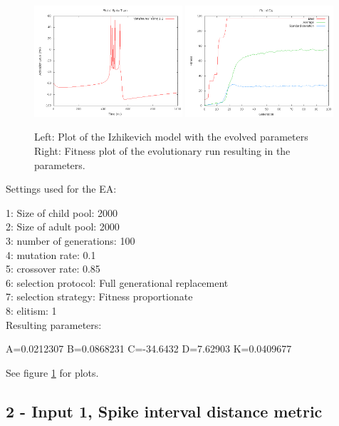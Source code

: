 \documentclass[11pt]{article}
\begin{document}
\begin{figure}
\begin{center}
\mbox{\includegraphics[width=0.49\textwidth]{images/1-res.png}}
\mbox{\includegraphics[width=0.49\textwidth]{images/1-fit.png}}
\end{center}
\caption{Left: Plot of the Izhikevich model with the evolved parameters\\
Right: Fitness plot of the evolutionary run resulting in the parameters.}
\label{fig:1}
\end{figure}

Settings used for the EA:

1: Size of child pool: 2000\\
2: Size of adult pool: 2000\\
3: number of generations: 100\\
4: mutation rate: 0.1\\
5: crossover rate: 0.85\\
6: selection protocol: Full generational replacement\\
7: selection strategy: Fitness proportionate\\
8: elitism: 1\\

Resulting parameters:

A=0.0212307 B=0.0868231 C=-34.6432 D=7.62903 K=0.0409677

See figure \ref{fig:1} for plots.

\subsection*{2 - Input 1, Spike interval distance metric}
\end{document}
